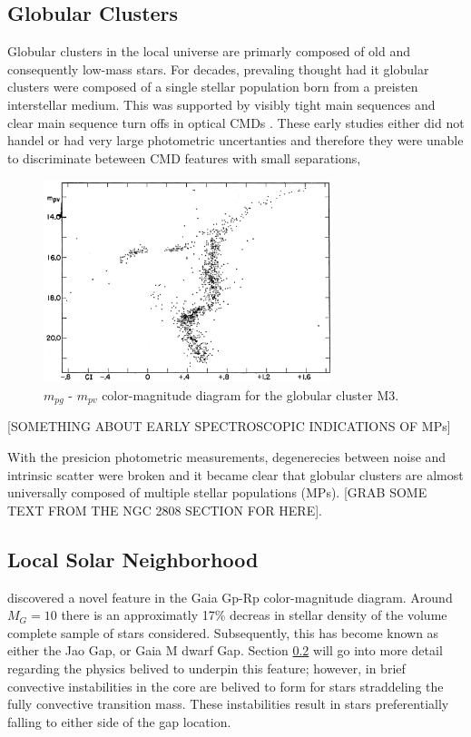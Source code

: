 \subsection{Globular Clusters}

Globular clusters in the local universe are primarly composed of old and
consequently low-mass stars. For decades, prevaling thought had it globular
clusters were composed of a single stellar population born from a preisten
interstellar medium. This was supported by visibly tight main sequences and
clear main sequence turn offs in optical CMDs \citep[Figure
\ref{fig:M3CMD}][]{Sandage1953}. These early studies either did not handel or
had very large photometric uncertanties and therefore they were unable to
discriminate beteween CMD features with small separations,

\begin{figure}
	\centering
	\includegraphics[width=0.75\textwidth]{src/Figures/Gould53.png}
	\caption{$m_{pg}$ - $m_{pv}$ color-magnitude diagram for the globular cluster M3.}
	\label{fig:M3CMD}
\end{figure}

[SOMETHING ABOUT EARLY SPECTROSCOPIC INDICATIONS OF MPs]

With the presicion photometric measurements, degenerecies between noise and
intrinsic scatter were broken and it became clear that globular clusters are
almost universally composed of multiple stellar populations (MPs). [GRAB SOME
TEXT FROM THE NGC 2808 SECTION FOR HERE].

\subsection{Local Solar Neighborhood}
\citet{Jao2018} discovered a novel feature in the Gaia Gp-Rp color-magnitude
diagram. Around $M_{G}=10$ there is an approximatly 17\% decreas in stellar
density of the volume complete sample of stars \citeauthor{Jao2018} considered.
Subsequently, this has become known as either the Jao Gap, or Gaia M dwarf Gap.
Section \ref{} will go into more detail regarding the physics belived to
underpin this feature; however, in brief convective instabilities in the core
are belived to form for stars straddeling the fully convective transition mass.
These instabilities result in stars preferentially falling to either side of
the gap location.

